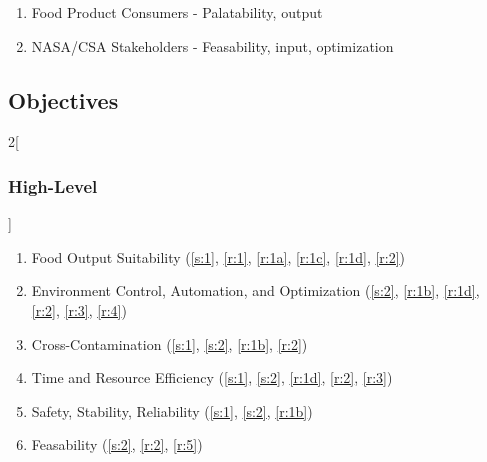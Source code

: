 \documentclass{report}
\begin{document}
\begin{enumerate}[label=S\arabic*., ref=S\arabic*]
    \item \label{s:1} Food Product Consumers - Palatability, output
    \item \label{s:2} NASA/CSA Stakeholders - Feasability, input, optimization
\end{enumerate}

\subsection{Objectives}
\label{sec:objectives}

\begin{multicols}{2}[\subsubsection{High-Level}\label{sec:hlos}]
    \begin{enumerate}[label=HL\arabic*., ref=HL\arabic*]
        \item \label{hl:output} Food Output Suitability \hfill (\ref{s:1}, \ref{r:1}, \ref{r:1a}, \ref{r:1c}, \ref{r:1d}, \ref{r:2})
        \item \label{hl:environment} Environment Control, Automation, and Optimization \hfill (\ref{s:2}, \ref{r:1b}, \ref{r:1d}, \ref{r:2}, \ref{r:3}, \ref{r:4})
        \item \label{hl:contamination} Cross-Contamination \hfill (\ref{s:1}, \ref{s:2}, \ref{r:1b}, \ref{r:2})
        \item \label{hl:efficiency} Time and Resource Efficiency \hfill (\ref{s:1}, \ref{s:2}, \ref{r:1d}, \ref{r:2}, \ref{r:3})
        \item \label{hl:safety} Safety, Stability, Reliability \hfill (\ref{s:1}, \ref{s:2}, \ref{r:1b})
        \item \label{hl:feasability} Feasability \hfill (\ref{s:2}, \ref{r:2}, \ref{r:5})
    \end{enumerate}
\end{multicols}
\end{document}
